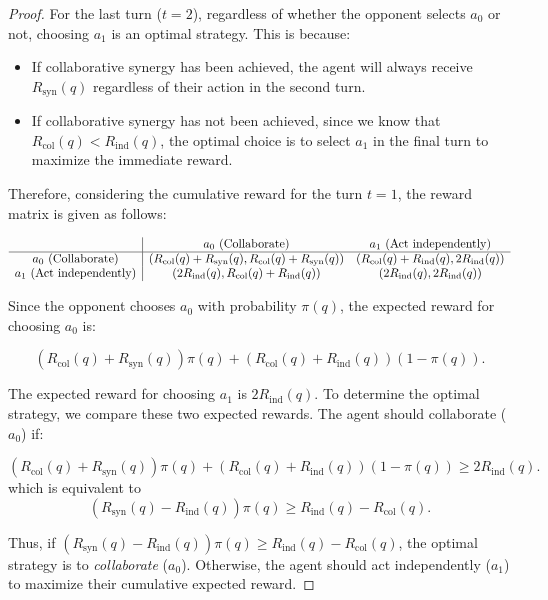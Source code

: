 \claimsingle*
\begin{proof}
For the last turn (\( {t} = 2 \)), regardless of whether the opponent selects \( a_0 \) or not, choosing \( a_1 \) is {an} optimal strategy. This is because:
\begin{itemize}
    \item If collaborative synergy has been  achieved, the agent will always receive \( R_{\text{syn}}(q) \) regardless of their action in the second turn.
    \item If collaborative synergy has not been achieved, since we know that \( R_{\text{col}}(q) < R_{\text{ind}}(q) \), the optimal choice is to select \( a_1 \) in the final turn to maximize the immediate reward.
\end{itemize}


Therefore, considering the cumulative reward for the turn $t=1$, the 
reward matrix is given as follows: 

\[
\begin{array}{c|cc}
 & \text{\( a_0 \) (Collaborate)} & \text{\( a_1 \) (Act independently)} \\ \hline
\text{\( a_0 \) (Collaborate)} & (R_{\text{col}}(q) + R_{\text{syn}}(q), R_{\text{col}}(q) + R_{\text{syn}}(q)) & (R_{\text{col}}(q) + R_{\text{ind}}(q), 2R_{\text{ind}}(q)) \\
\text{\( a_1 \) (Act independently)} & (2R_{\text{ind}}(q), R_{\text{col}}(q) + R_{\text{ind}}(q)) & (2R_{\text{ind}}(q), 2R_{\text{ind}}(q)) \\
\end{array}
\]

Since the opponent chooses \( a_0 \) with probability \( \pi(q) \), the expected reward for choosing \( a_0 \) is:

\[
(R_{\text{col}}(q) + R_{\text{syn}}(q)) \pi(q) + (R_{\text{col}}(q) + R_{\text{ind}}(q))(1-\pi(q)).
\]

The expected reward for choosing \( a_1 \) is $2R_{\text{ind}}(q)$. To determine the optimal strategy, we compare these two expected rewards. The agent should collaborate (\( a_0 \)) if:

\[
(R_{\text{col}}(q) + R_{\text{syn}}(q)) \pi(q) + (R_{\text{col}}(q) + R_{\text{ind}}(q))(1-\pi(q)) \geq  2R_{\text{ind}}(q).
\]
which is equivalent to 
\[
(R_{\text{syn}}(q) - R_{\text{ind}}(q))\pi(q) \geq R_{\text{ind}}(q) - R_{\text{col}}(q).
\]

Thus, if \( (R_{\text{syn}}(q) - R_{\text{ind}}(q))\pi(q) \geq R_{\text{ind}}(q) - R_{\text{col}}(q) \), the optimal strategy is to \textit{collaborate} (\( a_0 \)). Otherwise, the agent should act independently (\( a_1 \)) to maximize their cumulative expected reward.
\end{proof}

